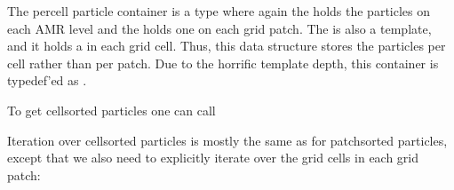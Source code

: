 \documentclass[letterpaper,10pt,english]{sphinxmanual}
\begin{document}
\sphinxAtStartPar
The per\sphinxhyphen{}cell particle container is a  type where again the  holds the particles on each AMR level and the  holds one  on each grid patch.
The  is also a template, and it holds a  in each grid cell.
Thus, this data structure stores the particles per cell rather than per patch.
Due to the horrific template depth, this container is typedef’ed as .

\sphinxAtStartPar
To get cell\sphinxhyphen{}sorted particles one can call

\begin{sphinxVerbatim}[commandchars=\\\{\},formatcom=\scriptsize]
   
\end{sphinxVerbatim}

\sphinxAtStartPar
Iteration over cell\sphinxhyphen{}sorted particles is mostly the same as for patch\sphinxhyphen{}sorted particles, except that we also need to explicitly iterate over the grid cells in each grid patch:
\end{document}
